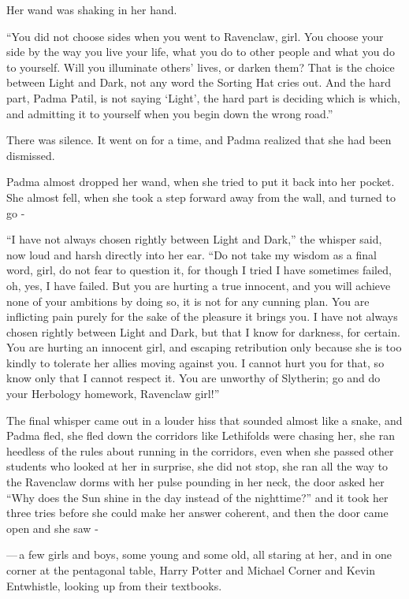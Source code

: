 Her wand was shaking in her hand.

``You did not choose sides when you went to Ravenclaw, girl. You choose your side by the way you live your life, what you do to other people and what you do to yourself. Will you illuminate others' lives, or darken them? That is the choice between Light and Dark, not any word the Sorting Hat cries out. And the hard part, Padma Patil, is not saying `Light', the hard part is deciding which is which, and admitting it to yourself when you begin down the wrong road.''

There was silence. It went on for a time, and Padma realized that she had been dismissed.

Padma almost dropped her wand, when she tried to put it back into her pocket. She almost fell, when she took a step forward away from the wall, and turned to go -

``I have not always chosen rightly between Light and Dark,'' the whisper said, now loud and harsh directly into her ear. ``Do not take my wisdom as a final word, girl, do not fear to question it, for though I tried I have sometimes failed, oh, yes, I have failed. But you are hurting a true innocent, and you will achieve none of your ambitions by doing so, it is not for any cunning plan. You are inflicting pain purely for the sake of the pleasure it brings you. I have not always chosen rightly between Light and Dark, but that I know for darkness, for certain. You are hurting an innocent girl, and escaping retribution only because she is too kindly to tolerate her allies moving against you. I cannot hurt you for that, so know only that I cannot respect it. You are unworthy of Slytherin; go and do your Herbology homework, Ravenclaw girl!''

The final whisper came out in a louder hiss that sounded almost like a snake, and Padma fled, she fled down the corridors like Lethifolds were chasing her, she ran heedless of the rules about running in the corridors, even when she passed other students who looked at her in surprise, she did not stop, she ran all the way to the Ravenclaw dorms with her pulse pounding in her neck, the door asked her ``Why does the Sun shine in the day instead of the nighttime?'' and it took her three tries before she could make her answer coherent, and then the door came open and she saw -

---\,a few girls and boys, some young and some old, all staring at her, and in one corner at the pentagonal table, Harry Potter and Michael Corner and Kevin Entwhistle, looking up from their textbooks.

